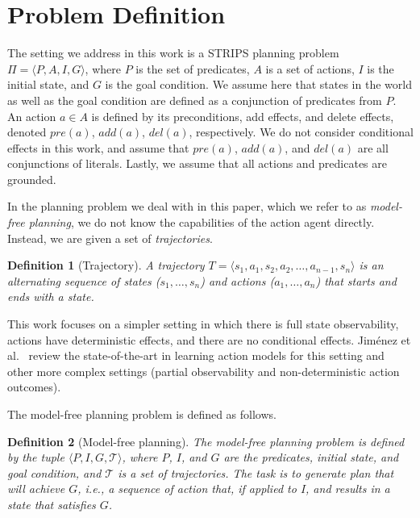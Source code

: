 \documentclass[letterpaper]{article}
\newtheorem{definition}{Definition}
\begin{document}
\section{Problem Definition}
The setting we address in this work is a STRIPS planning problem $\Pi=\langle P, A, I, G\rangle$, where $P$ is the set of predicates, $A$ is a set of actions, $I$ is the initial state, and $G$ is the goal condition. We assume here that states in the world as well as the goal condition are defined as a conjunction of predicates from $P$. An action $a\in A$ is defined by its preconditions, add effects, and delete effects, denoted $pre(a)$, $add(a)$, $del(a)$, respectively. 
We do not consider conditional effects in this work, and assume that 
$pre(a)$, $add(a)$, and $del(a)$ are all conjunctions of literals. Lastly, we assume that all actions and predicates are grounded. 


In the planning problem we deal with in this paper, which we refer to as {\em model-free planning}, we do not know the capabilities of the action agent directly. Instead, we are given a set of {\em trajectories}. 
\begin{definition}[Trajectory]
A trajectory $T=\langle s_1, a_1, s_2, a_2, \ldots, a_{n-1}, s_n\rangle$ is an alternating sequence of states ($s_1,\ldots,s_n$) and actions ($a_1,\ldots,a_n$) that starts and ends with a state. 
\end{definition}
This work focuses on a simpler setting in which there is full state observability, actions have deterministic effects, and there are no conditional effects. Jim{\'e}nez et al.~ review the state-of-the-art in learning action models for this setting and other more complex settings (partial observability and non-deterministic action outcomes). 


The model-free planning problem is defined as follows.
\begin{definition}[Model-free planning]
The model-free planning problem is defined by the tuple $\langle P,I,G, \mathcal{T}\rangle$, 
where $P$, $I$, and $G$ are the predicates, initial state, and goal condition, and $\mathcal{T}$ is a set of trajectories. The task is to generate plan that will achieve $G$, i.e., a sequence of action that, if applied to $I$, and results in a state that satisfies $G$.
\end{definition}
\end{document}
